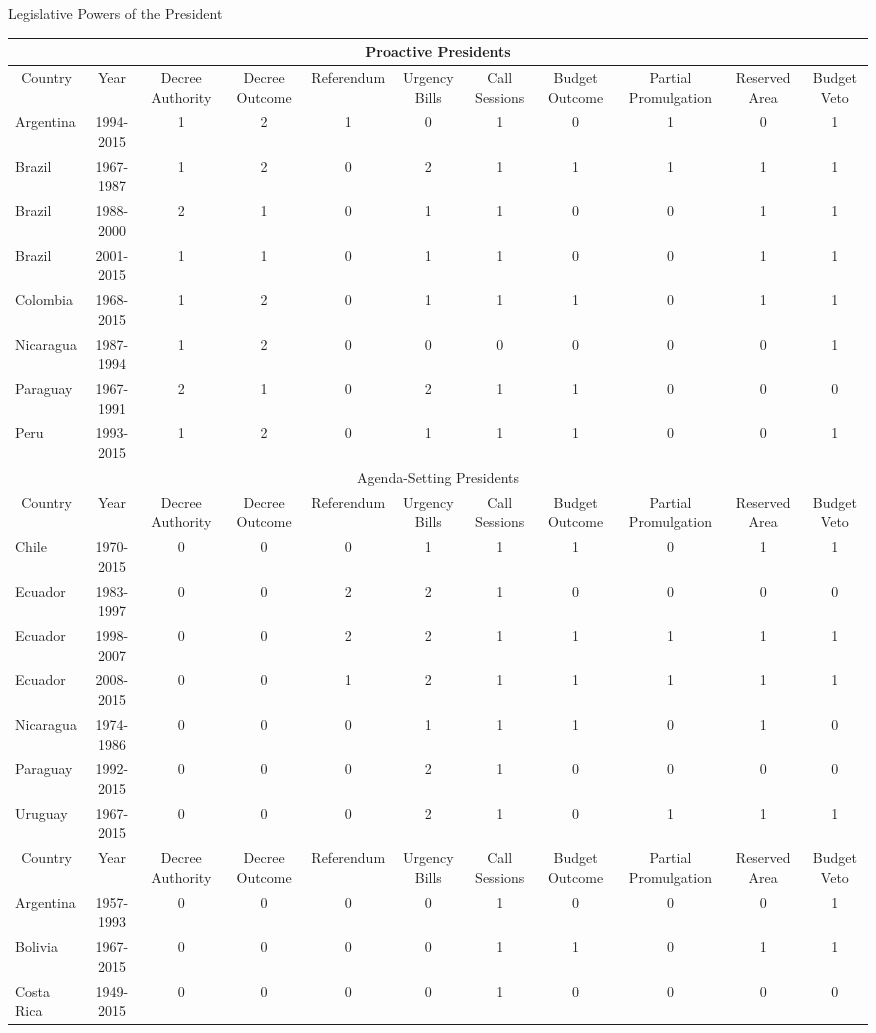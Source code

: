 \documentclass{article}
\begin{document}
\begin{landscape}
\begin{center}
    {\Large Legislative Powers of the President} \\


\begin{scriptsize}
\begin{tabular}{lcccccccccc}
\multicolumn{11}{c}{Proactive Presidents} \\ \hline
\multicolumn{1}{c}{Country}&Year&Decree Authority&Decree Outcome&Referendum&Urgency Bills&Call Sessions&Budget Outcome&Partial Promulgation&Reserved Area&Budget Veto\\ \hline
Argentina&1994-2015&1&2&1&0&1&0&1&0&1\\
Brazil&1967-1987&1&2&0&2&1&1&1&1&1\\
Brazil&1988-2000&2&1&0&1&1&0&0&1&1\\
Brazil&2001-2015&1&1&0&1&1&0&0&1&1\\
Colombia&1968-2015&1&2&0&1&1&1&0&1&1\\
Nicaragua&1987-1994&1&2&0&0&0&0&0&0&1\\
Paraguay&1967-1991&2&1&0&2&1&1&0&0&0\\
Peru&1993-2015&1&2&0&1&1&1&0&0&1\\
\multicolumn{11}{c}{Agenda-Setting Presidents} \\ \hline
\multicolumn{1}{c}{Country}&Year&Decree Authority&Decree Outcome&Referendum&Urgency Bills&Call Sessions&Budget Outcome&Partial Promulgation&Reserved Area&Budget Veto\\ \hline
Chile&1970-2015&0&0&0&1&1&1&0&1&1\\
Ecuador&1983-1997&0&0&2&2&1&0&0&0&0\\
Ecuador&1998-2007&0&0&2&2&1&1&1&1&1\\
Ecuador&2008-2015&0&0&1&2&1&1&1&1&1\\
Nicaragua&1974-1986&0&0&0&1&1&1&0&1&0\\
Paraguay&1992-2015&0&0&0&2&1&0&0&0&0\\
Uruguay&1967-2015&0&0&0&2&1&0&1&1&1\\
\multicolumn{1}{c}{Country}&Year&Decree Authority&Decree Outcome&Referendum&Urgency Bills&Call Sessions&Budget Outcome&Partial Promulgation&Reserved Area&Budget Veto\\ \hline
Argentina&1957-1993&0&0&0&0&1&0&0&0&1\\
Bolivia&1967-2015&0&0&0&0&1&1&0&1&1\\
Costa Rica&1949-2015&0&0&0&0&1&0&0&0&0\\

\end{tabular}
\end{scriptsize}
\end{center}
\end{landscape}
\end{document}
